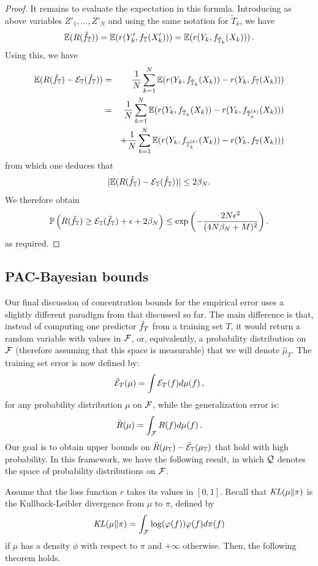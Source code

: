 \begin{proof}
It remains to evaluate the expectation in this formula. Introducing as above variables $Z'_1, \ldots, Z'_N$ and using the same notation for $\tilde T_k$, we have
\[
\bm{\mathbb E}(R({\hat{f}}_{\mathbb T})) = \bm{\mathbb E}(r(Y'_k, f_{\mathbb T}(X'_k))) = \bm{\mathbb E}(r(Y_k, f_{\tilde {{\mathbb T}}_k}(X_k)))\,.
\]
Using this, we have
\begin{eqnarray*}
\bm{\mathbb E}(R({\hat{f}}_{\mathbb T}) - {\mathcal E}_{\mathbb T}({\hat{f}}_{\mathbb T})) &=& \frac1N \sum_{k=1}^N \bm{\mathbb E}(r(Y_k, f_{\tilde {{\mathbb T}}_k}(X_k))-r(Y_k, f_{{\mathbb T}}(X_k)))\\
&=& \frac1N \sum_{k=1}^N \bm{\mathbb E}(r(Y_k, f_{\tilde {{\mathbb T}}_k}(X_k))-r(Y_k, f_{\tilde {{\mathbb T}}_k^{(k)}}(X_k)))\\
&& + \frac1N \sum_{k=1}^N \bm{\mathbb E}(r(Y_k, f_{{\mathbb T}^{(k)}_k}(X_k))-r(Y_k, f_{{\mathbb T}}(X_k))) 
\end{eqnarray*}
from which one deduces that
\[
|\bm{\mathbb E}(R({\hat{f}}_{\mathbb T}) - {\mathcal E}_{\mathbb T}({\hat{f}}_{\mathbb T}))| \leq 2\beta_N.
\]
We therefore obtain  
\[
\bm{\mathbb P}\left(R({\hat{f}}_{\mathbb T}) \geq {\mathcal E}_{\mathbb T}({\hat{f}}_{\mathbb T}) + \epsilon + 2\beta_N\right) \leq \exp\left(- \frac{2N\epsilon^2}{(4N\beta_N + M)^2}\right).
\]
as required.
\end{proof}

\subsection{PAC-Bayesian bounds}
\label{sec:pacb}
Our final discussion of concentration bounds for the empirical error uses a slightly different paradigm from that discussed so far. The main difference is that, instead of computing one predictor ${\hat{f}}_T$ from a training set $T$, it would return a random variable with values in ${\mathcal F}$, or, equivalently, a probability distribution on ${\mathcal F}$ (therefore assuming that this space is measurable) that we will denote $\hat\mu_T$. The training set error is now defined by:
\[
\bar {{\mathcal E}}_T(\mu) = \int {\mathcal E}_T(f)  d\mu(f)\,,
\]
for any probability distribution $\mu$ on ${\mathcal F}$, while the generalization error is:
\[
\bar R(\mu) = \int_{{\mathcal F}} R(f) d\mu(f)\,.
\]
Our goal is to obtain upper bounds on $\bar R(\mu_{\mathbb T}) - \bar {{\mathcal E}}_{\mathbb T}(\mu_{\mathbb T})$ that hold with high probability. In this framework, we have the following result, in which ${\mathcal Q}$ denotes the space of probability distributions on ${\mathcal F}$. 

Assume that the loss function $r$ takes its values in $[0,1]$.
Recall that $\mathit{KL}(\mu\|\pi)$ is the Kullback-Leibler divergence from $\mu$ to $\pi$, defined by
\[
\mathit{KL}(\mu\|\pi) = \int_{{\mathcal F}} \log(\varphi(f)) \varphi(f) d\pi(f)
\]
if $\mu$ has a density $\phi$ with respect to $\pi$ and $+\infty$ otherwise. Then, the following theorem holds.

